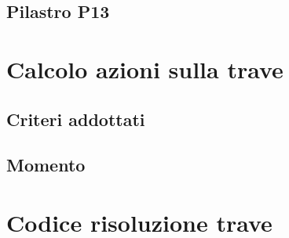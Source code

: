 \section{Pilastro P13}

\chapter{Calcolo azioni sulla trave}
\section{Criteri addottati}
\section{Momento}

\appendix
\chapter{Codice risoluzione trave}
